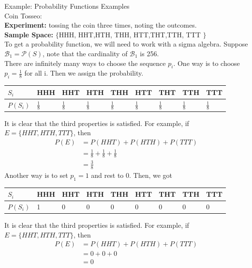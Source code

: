 \documentclass[11pt,oneside]{book}
\theoremstyle{break}
\theoremstyle{break}
\newcommand{\example}{\color{WildStrawberry}Example: \color{black}}
\begin{document}
	\example Probability Functions Examples\\
\text{\quad} Coin Tosseo: \\
\text{\quad} \textbf{Experiment: }tossing the coin three times, noting the outcomes.\\
\text{\quad} \textbf{Sample Space:} $\{$HHH, HHT,HTH, THH, HTT,THT,TTH, TTT $\}$\\
	To get a probability function, we will need to work with a sigma algebra. Suppose $\mathcal{B}_1=\mathcal{P}(S)$, note that the cardinality of $\mathcal{B}_1$ is 256.\\
	There are infinitely many ways to choose the sequence ${p_i}$. One way is to choose $p_i=\frac{1}{8}$ for all i. Then we assign the probability.\\
\begin{center}
\begin{tabular}{|l|l|l|l|l|l|l|l|l|}
\hline
$S_i$    & HHH           & HHT           & HTH           & THH           & HTT           & THT           & TTH           & TTT           \\ \hline
$P(S_i)$ & $\frac{1}{8}$ & $\frac{1}{8}$ & $\frac{1}{8}$ & $\frac{1}{8}$ & $\frac{1}{8}$ & $\frac{1}{8}$ & $\frac{1}{8}$ & $\frac{1}{8}$ \\ \hline
\end{tabular}
\end{center}
It is clear that the third properties is satisfied. For example, if $E=\{HHT, HTH, TTT\}$, then \begin{align*}
P(E)&= P(HHT)+P(HTH)+P(TTT)\\
&= \frac{1}{8}+\frac{1}{8}+\frac{1}{8}\\
&=\frac{3}{8}
\end{align*}
	 Another way is to set $p_1=1$ and rest to 0. Then, we got \begin{center}
\begin{tabular}{|l|l|l|l|l|l|l|l|l|}
\hline
$S_i$    & HHH & HHT & HTH & THH & HTT & THT & TTH & TTT \\ \hline
$P(S_i)$ & 1   & 0   & 0   & 0   & 0   & 0   & 0   & 0   \\ \hline
\end{tabular}
 \end{center}
 It is clear that the third properties is satisfied. For example, if $E=\{HHT, HTH, TTT\}$, then \begin{align*}
P(E)&= P(HHT)+P(HTH)+P(TTT)\\
&= 0 + 0 + 0 \\
&= 0
\end{align*}
\end{document}
